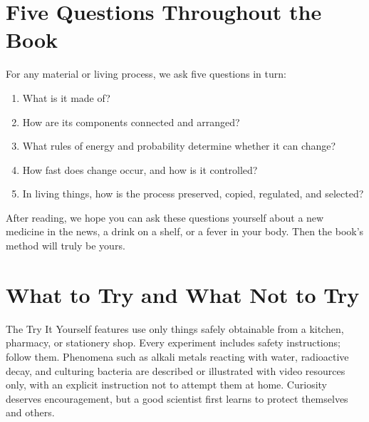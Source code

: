 \section*{Five Questions Throughout the Book}

For any material or living process, we ask five questions in turn:

\begin{enumerate}[itemsep=2pt]
\item What is it made of?
\item How are its components connected and arranged?
\item What rules of energy and probability determine whether it can change?
\item How fast does change occur, and how is it controlled?
\item In living things, how is the process preserved, copied, regulated, and selected?
\end{enumerate}

After reading, we hope you can ask these questions yourself about a new medicine in the news, a drink on a shelf, or a fever in your body. Then the book's method will truly be yours.

\section*{What to Try and What Not to Try}

The Try It Yourself features use only things safely obtainable from a kitchen, pharmacy, or stationery shop. Every experiment includes safety instructions; follow them. Phenomena such as alkali metals reacting with water, radioactive decay, and culturing bacteria are described or illustrated with video resources only, with an explicit instruction not to attempt them at home. Curiosity deserves encouragement, but a good scientist first learns to protect themselves and others.
